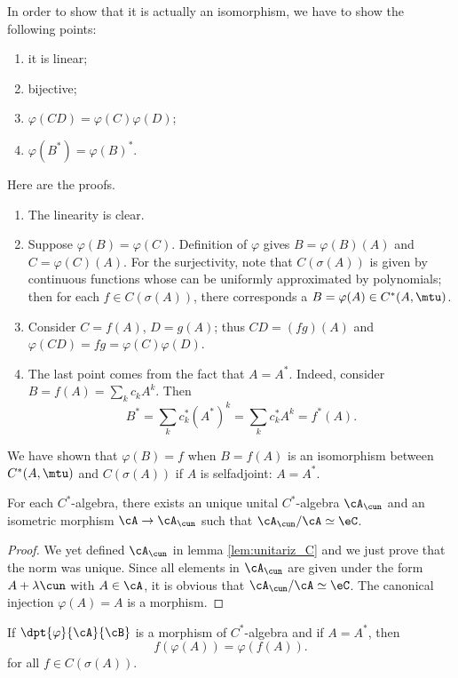 In order to show that it is actually an isomorphism, we have to show the following points:
 \begin{enumerate}
     \item
          it is linear;
      \item
         bijective;
     \item
         $\varphi(CD)=\varphi(C)\varphi(D)$;
     \item
         $\varphi(B^*)=\varphi(B)^*$.
 \end{enumerate}
 Here are the proofs.
 \begin{enumerate}
     \item       
        The linearity is clear.
    \item       
        Suppose $\varphi(B)=\varphi(C)$. Definition of $\varphi$ gives $B=\varphi(B)(A)$ and $C=\varphi(C)(A)$. For the surjectivity, note that $C(\sigma(A))$ is given by continuous functions whose can be uniformly approximated by polynomials; then for each $f\in C( \sigma(A))$, there corresponds a $B=\varphi(A)\in C^*(A,\mtu)$.
    \item
        Consider $C=f(A)$, $D=g(A)$; thus $CD=(fg)(A)$ and $\varphi(CD)=fg=\varphi(C)\varphi(D)$. 
    \item
        The last point comes from the fact that $A=A^*$. Indeed, consider $B=f(A)=\sum_k c_kA^k$. Then
        \[
            B^*=\sum_k c_k^*(A^*)^k=\sum_k c_k^*A^k=f^*(A).
        \]
 \end{enumerate}

We have shown that $\varphi(B)=f$ when $B=f(A)$ is an isomorphism between $C^*(A,\mtu)$ and $C(\sigma(A))$ if $A$ is selfadjoint: $A=A^*$.

\begin{corollary}
For each $C^*$-algebra, there exists an unique unital $C^*$-algebra $\cA_{\cun}$ and an isometric morphism $\cA\to\cA_{\cun}$ such that $\cA_{\cun}/\cA\simeq\eC$.
\end{corollary}\label{cor_csa_unit}

\begin{proof}
We yet defined $\cA_{\cun}$ in lemma \ref{lem:unitariz_C} and we just prove that the norm was unique. Since all elements in $\cA_{\cun}$ are given under the form $A+\lambda\cun$ with $A\in\cA$, it is obvious that $\cA_{\cun}/\cA\simeq\eC$. The canonical injection $\varphi(A)=A$ is a morphism.
\end{proof}


\begin{lemma}
If $\dpt{\varphi}{\cA}{\cB}$ is a morphism of $C^*$-algebra and if $A=A^*$, then 
\[ 
  f(\varphi(A))=\varphi(f(A)).
\]
for all $f\in C(\sigma(A))$.
\end{lemma} \label{lem:fvpvpf}


